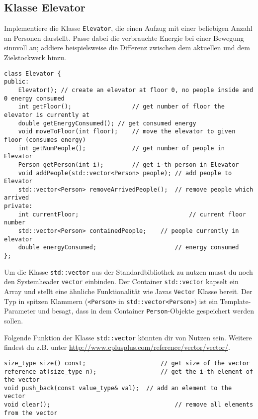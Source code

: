 \subsection{Klasse Elevator}
Implementiere die Klasse \texttt{Elevator}, die einen Aufzug mit einer beliebigen Anzahl an Personen darstellt.
Passe dabei die verbrauchte Energie bei einer Bewegung sinnvoll an; addiere beispielsweise die Differenz zwischen dem aktuellen und dem Zielstockwerk hinzu.

\begin{lstlisting}
class Elevator {
public:
	Elevator();	// create an elevator at floor 0, no people inside and 0 energy consumed
	int getFloor();					// get number of floor the elevator is currently at
	double getEnergyConsumed();	// get consumed energy
	void moveToFloor(int floor);	// move the elevator to given floor (consumes energy)
	int getNumPeople();				// get number of people in Elevator
	Person getPerson(int i);		// get i-th person in Elevator
	void addPeople(std::vector<Person> people);	// add people to Elevator
	std::vector<Person> removeArrivedPeople();	// remove people which arrived
private:
	int currentFloor;								// current floor number
	std::vector<Person> containedPeople;	// people currently in elevator
	double energyConsumed;						// energy consumed
};
\end{lstlisting}

Um die Klasse \texttt{std::vector} aus der Standardbibliothek zu nutzen musst du noch den Systemheader \texttt{vector} einbinden.
Der Container \texttt{std::vector} kapselt ein Array und stellt eine ähnliche Funktionalität wie Javas \texttt{Vector} Klasse bereit.
Der Typ in spitzen Klammern (\texttt{<Person>} in \texttt{std::vector<Person>}) ist ein Template-Parameter und besagt, dass in dem Container \texttt{Person}-Objekte gespeichert werden sollen.

Folgende Funktion der Klasse \texttt{std::vector} könnten dir von Nutzen sein. Weitere findest du z.B. unter \url{http://www.cplusplus.com/reference/vector/vector/}.

\begin{lstlisting}
size_type size() const;						// get size of the vector
reference at(size_type n);					// get the i-th element of the vector
void push_back(const value_type& val);	// add an element to the vector
void clear();									// remove all elements from the vector
\end{lstlisting}

